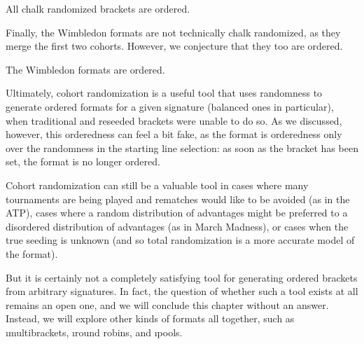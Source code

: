 {    \begin{conj}{}{}
        All chalk randomized brackets are ordered.
    \end{conj}

    Finally, the Wimbledon formats are not technically chalk randomized, as they merge the first two cohorts. However, we conjecture that they too are ordered.

    \begin{conj}{}{}
        The Wimbledon formats are ordered.
    \end{conj}

    Ultimately, cohort randomization is a useful tool that uses randomness to generate ordered formats for a given signature (balanced ones in particular), when traditional and reseeded brackets were unable to do so. As we discussed, however, this orderedness can feel a bit fake, as the format is orderedness only over the randomness in the starting line selection: as soon as the bracket has been set, the format is no longer ordered.

    Cohort randomization can still be a valuable tool in cases where many tournaments are being played and rematches would like to be avoided (as in the ATP), cases where a random distribution of advantages might be preferred to a disordered distribution of advantages (as in March Madness), or cases when the true seeding is unknown (and so total randomization is a more accurate model of the format).
    
    But it is certainly not a completely satisfying tool for generating ordered brackets from arbitrary signatures. In fact, the question of whether such a tool exists at all remains an open one, and we will conclude this chapter without an answer. Instead, we will explore other kinds of formats all together, such as \i{multibrackets}, \i{round robins}, and \i{pools}.
    




    
    
}